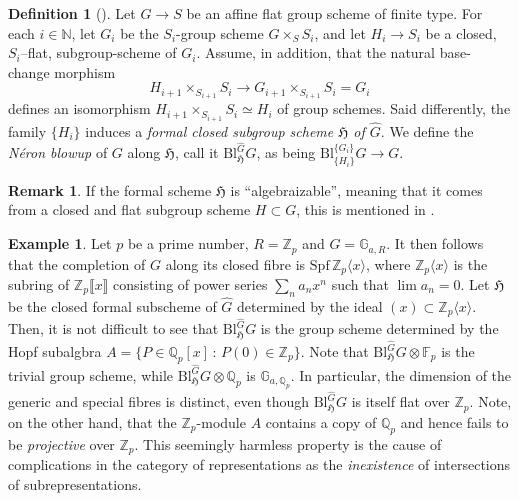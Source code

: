 \documentclass[10pt]{alggeom}
\theoremstyle{definition}
\newtheorem{ex}[thm]{Example}
\newtheorem{rmk}[thm]{Remark}
\newtheorem{dfn}[thm]{Definition}
\numberwithin{equation}{section}
\begin{document}
\begin{dfn}[{\cite[Definition 5.6]{duong-hai-dos_santos18}}]\label{15.05.2023--1} Let  $G\to S$ be an affine flat group scheme of finite type. For each $i\in\mathbb N$, let $G_i$ be the $S_i$-group scheme $G\times_{S}S_i$, and let  $H_i\to S_i$ be a closed,  $S_i$--flat, subgroup-scheme of  $G_i$. Assume, in addition, that the natural base-change morphism 
\[
H_{i+1}\times_{S_{i+1}} S_i\longrightarrow G_{i+1}\times_{S_{i+1}} S_i=G_i
\]  
defines an isomorphism  $H_{i+1}\times_{S_{i+1}} S_i\simeq H_i$ of group schemes. 
Said differently, the family $\{H_i\}$ induces a {\it formal closed subgroup scheme $\mathfrak H$ of $\widehat G$}.
We define the {\it     N\'eron blowup} of $G$ along $\mathfrak H$, call it $\mathrm{Bl}^{\widehat G}_{\mathfrak H} G$, as being $\mathrm{Bl}_{\{H_i\}}^{\{G_
i\}}G\to G$. 
\end{dfn}





\begin{rmk} If the formal scheme  $\mathfrak H$ is ``algebraizable'', meaning that it comes from a closed and flat subgroup scheme $H\subset G$, this is mentioned in \cite[\S7.2]{PY06}. 
\end{rmk}

\begin{ex}\label{05.06.2023--2jp}Let $p$ be a prime number,  $R=\mathbb Z_p$ and $G=\mathbb G_{a,R}$. It then follows that the completion of $G$ along its closed fibre is $\mathrm{Spf}\,\mathbb Z_p\langle x\rangle$, where $\mathbb Z_p\langle x\rangle$ is the subring of $\mathbb Z_p\llbracket x\rrbracket$ consisting of power series $\sum_na_nx^n$ such that $\lim a_n=0$. 
Let $\mathfrak H$ be the closed formal subscheme of $\widehat G$ determined by the ideal $(x)\subset \mathbb Z_p\langle x\rangle$.  Then, it is not difficult to see that $\mathrm{Bl}_{\mathfrak H}^{\widehat G}G$ is the group scheme determined by the Hopf subalgbra $A=\{P\in \mathbb Q_p[x]\,:\,P(0)\in \mathbb Z_p\}$. Note that $\mathrm{Bl}_{\mathfrak H}^{\widehat G}G\otimes \mathbb F_p$ is the trivial group scheme, while $\mathrm{Bl}_{\mathfrak H}^{\widehat G}G\otimes \mathbb Q_p$ is $\mathbb G_{a,\mathbb Q_p}$. In particular, the dimension of the generic and special fibres is distinct, even though $\mathrm{Bl}_{\mathfrak H}^{\widehat G}G$ is itself flat over $\mathbb Z_p$. Note, on the other hand, that the $\mathbb Z_p$-module $A$ contains a copy of $\mathbb Q_p$ and hence fails to be {\it projective} over $\mathbb Z_p$. This seemingly harmless property is the cause of complications in the category of representations \cite[Proposition 6.19]{hai-dos_santos21} as the {\it inexistence} of  intersections of subrepresentations.  
\end{ex}
\end{document}
